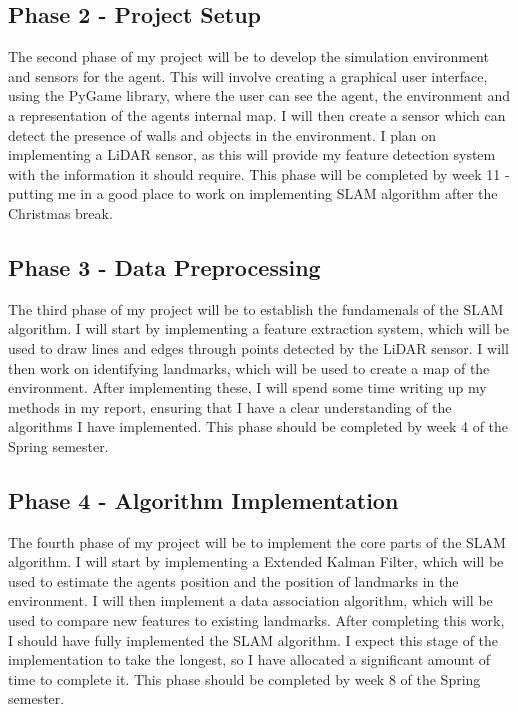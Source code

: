 \documentclass[12pt]{article}
\begin{document}
\subsection{Phase 2 - Project Setup}
The second phase of my project will be to develop the simulation environment and sensors for the agent. This will involve
creating a graphical user interface, using the PyGame library, where the user can see the agent, the environment and a
representation of the agents internal map. I will then create a sensor which can detect the presence of walls and objects
in the environment. I plan on implementing a LiDAR sensor, as this will provide my feature detection system with the information
it should require. This phase will be completed by week 11 - putting me in a good place to work on implementing SLAM algorithm
after the Christmas break.

\subsection{Phase 3 - Data Preprocessing}
The third phase of my project will be to establish the fundamenals of the SLAM algorithm. I will start by implementing a feature
extraction system, which will be used to draw lines and edges through points detected by the LiDAR sensor. I will then work on
identifying landmarks, which will be used to create a map of the environment. After implementing these, I will spend some time
writing up my methods in my report, ensuring that I have a clear understanding of the algorithms I have implemented. This phase
should be completed by week 4 of the Spring semester.

\subsection{Phase 4 - Algorithm Implementation}
The fourth phase of my project will be to implement the core parts of the SLAM algorithm. I will start by implementing a Extended
Kalman Filter, which will be used to estimate the agents position and the position of landmarks in the environment. I will then
implement a data association algorithm, which will be used to compare new features to existing landmarks. After completing this
work, I should have fully implemented the SLAM algorithm. I expect this stage of the implementation to take the longest, so I have
allocated a significant amount of time to complete it. This phase should be completed by week 8 of the Spring semester.
\end{document}
